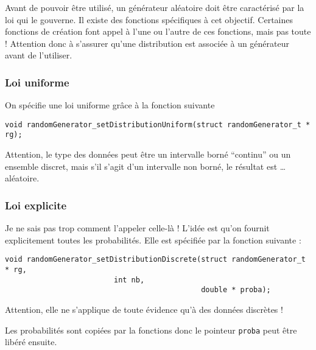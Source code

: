 \documentclass{article}
\begin{document}
   Avant de pouvoir être utilisé, un générateur aléatoire doit être
caractérisé par la loi qui le gouverne. Il existe des fonctions
spécifiques à cet objectif. Certaines fonctions de création font appel
à l'une ou l'autre de ces fonctions, mais pas toute ! Attention donc à
s'assurer qu'une distribution est associée à un générateur avant de
l'utiliser.

%
\subsubsection{Loi uniforme}

   On spécifie une loi uniforme grâce à la fonction suivante

\begin{verbatim}
void randomGenerator_setDistributionUniform(struct randomGenerator_t * rg);
\end{verbatim}

   Attention, le type des données peut être un intervalle borné
``continu'' ou un ensemble discret, mais s'il s'agit d'un intervalle
non borné, le résultat est \ldots {} aléatoire.

%
\subsubsection{Loi  explicite}

   Je ne sais pas trop comment l'appeler celle-là ! L'idée est qu'on
fournit explicitement toutes les probabilités. Elle est spécifiée par
la fonction suivante :

\begin{verbatim}
void randomGenerator_setDistributionDiscrete(struct randomGenerator_t * rg,
					     int nb,
                                             double * proba);
\end{verbatim}

   Attention, elle ne s'applique de toute évidence qu'à des données
discrètes !

   Les probabilités sont copiées par la fonctions donc le pointeur
{\tt proba} peut être libéré ensuite.

%
\end{document}
